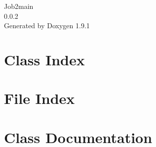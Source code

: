 \let\mypdfximage\pdfximage\def\pdfximage{\immediate\mypdfximage}\documentclass[twoside]{book}
\newcommand{\+}{\discretionary{\mbox{\scriptsize$\hookleftarrow$}}{}{}}
\newcommand{\clearemptydoublepage}{%
  \newpage{\pagestyle{empty}\cleardoublepage}%
}
\begin{document}
\raggedbottom

\hypersetup{pageanchor=false,
             bookmarksnumbered=true,
             pdfencoding=unicode
            }
\begin{titlepage}
\vspace*{7cm}
\begin{center}%
{\Large Job2main \\[1ex]\large 0.\+0.\+2 }\\
\vspace*{1cm}
{\large Generated by Doxygen 1.9.1}\\
\end{center}
\end{titlepage}
\clearemptydoublepage
{}
\tableofcontents
\clearemptydoublepage
{}
\hypersetup{pageanchor=true}

\chapter{Class Index}

\chapter{File Index}

\chapter{Class Documentation}


























\end{document}
